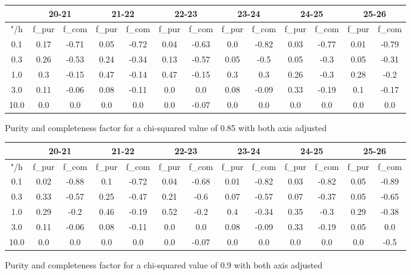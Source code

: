 \documentclass{article}
\begin{document}
\begin{figure}[H]
\centering
\begin{tabular}{|c|c|c|c|c|c|c|c|c|c|c|c|c|}
\hline
\multicolumn{1}{|c|}{} & \multicolumn{2}{|c|}{20-21} & \multicolumn{2}{|c|}{21-22} & \multicolumn{2}{|c|}{22-23} & \multicolumn{2}{|c|}{23-24} & \multicolumn{2}{|c|}{24-25} & \multicolumn{2}{|c|}{25-26}\\
\hline \hline
"/h & f\_pur & f\_com & f\_pur & f\_com & f\_pur & f\_com & f\_pur & f\_com & f\_pur & f\_com & f\_pur & f\_com \\
\hline
0.1 & 0.17 & -0.71 & 0.05 & -0.72 & 0.04 & -0.63 & 0.0 & -0.82 & 0.03 & -0.77 & 0.01 & -0.79\\
\hline
0.3 & 0.26 & -0.53 & 0.24 & -0.34 & 0.13 & -0.57 & 0.05 & -0.5 & 0.05 & -0.3 & 0.05 & -0.31\\
\hline
1.0 & 0.3 & -0.15 & 0.47 & -0.14 & 0.47 & -0.15 & 0.3 & 0.3 & 0.26 & -0.3 & 0.28 & -0.2\\
\hline
3.0 & 0.11 & -0.06 & 0.08 & -0.11 & 0.0 & 0.0 & 0.08 & -0.09 & 0.33 & -0.19 & 0.1 & -0.17\\
\hline
10.0 & 0.0 & 0.0 & 0.0 & 0.0 & 0.0 & -0.07 & 0.0 & 0.0 & 0.0 & 0.0 & 0.0 & 0.0\\
\hline
\end{tabular}
\caption{Purity and completeness factor for a chi-squared value of 0.85 with both axis adjusted}
\end{figure}

\begin{figure}[H]
\centering
\begin{tabular}{|c|c|c|c|c|c|c|c|c|c|c|c|c|}
\hline
\multicolumn{1}{|c|}{} & \multicolumn{2}{|c|}{20-21} & \multicolumn{2}{|c|}{21-22} & \multicolumn{2}{|c|}{22-23} & \multicolumn{2}{|c|}{23-24} & \multicolumn{2}{|c|}{24-25} & \multicolumn{2}{|c|}{25-26}\\
\hline \hline
"/h & f\_pur & f\_com & f\_pur & f\_com & f\_pur & f\_com & f\_pur & f\_com & f\_pur & f\_com & f\_pur & f\_com \\
\hline
0.1 & 0.02 & -0.88 & 0.1 & -0.72 & 0.04 & -0.68 & 0.01 & -0.82 & 0.03 & -0.82 & 0.05 & -0.89\\
\hline
0.3 & 0.33 & -0.57 & 0.25 & -0.47 & 0.21 & -0.6 & 0.07 & -0.57 & 0.07 & -0.37 & 0.05 & -0.65\\
\hline
1.0 & 0.29 & -0.2 & 0.46 & -0.19 & 0.52 & -0.2 & 0.4 & -0.34 & 0.35 & -0.3 & 0.29 & -0.38\\
\hline
3.0 & 0.11 & -0.06 & 0.08 & -0.11 & 0.0 & 0.0 & 0.08 & -0.09 & 0.33 & -0.19 & 0.05 & 0.0\\
\hline
10.0 & 0.0 & 0.0 & 0.0 & 0.0 & 0.0 & -0.07 & 0.0 & 0.0 & 0.0 & 0.0 & 0.0 & -0.5\\
\hline
\end{tabular}
\caption{Purity and completeness factor for a chi-squared value of 0.9 with both axis adjusted}
\end{figure}
\end{document}
